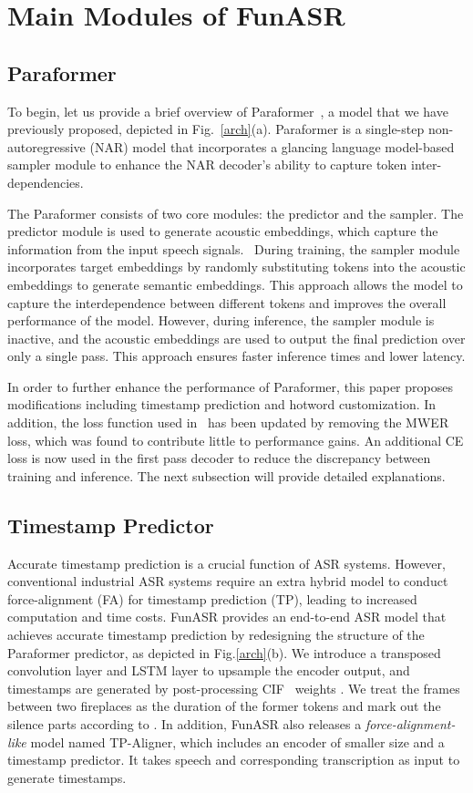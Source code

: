 \documentclass{INTERSPEECH2023}
\begin{document}
\section{Main Modules of FunASR}

\subsection{Paraformer}

To begin, let us provide a brief overview of Paraformer~\cite{gao2022paraformer}, a model that we have previously proposed, depicted in Fig.~\ref{arch}(a). Paraformer is a single-step non-autoregressive (NAR) model that incorporates a glancing language model-based sampler module to enhance the NAR decoder's ability to capture token inter-dependencies.


The Paraformer consists of two core modules: the predictor and the sampler. The predictor module is used to generate acoustic embeddings, which capture the information from the input speech signals. 
\
During training, the sampler module incorporates target embeddings by randomly substituting tokens into the acoustic embeddings to generate semantic embeddings. This approach allows the model to capture the interdependence between different tokens and improves the overall performance of the model. However, during inference, the sampler module is inactive, and the acoustic embeddings are used to output the final prediction over only a single pass. This approach ensures faster inference times and lower latency.


In order to further enhance the performance of Paraformer, this paper proposes modifications including timestamp prediction and hotword customization. In addition, the loss function used in~\cite{gao2022paraformer} has been updated by removing the MWER loss, which was found to contribute little to performance gains. An additional CE loss is now used in the first pass decoder to reduce the discrepancy between training and inference. The next subsection will provide detailed explanations.

\subsection{Timestamp Predictor}

Accurate timestamp prediction is a crucial function of ASR systems. However, conventional industrial ASR systems require an extra hybrid model to conduct force-alignment (FA) for timestamp prediction (TP), leading to increased computation and time costs. FunASR provides an end-to-end ASR model that achieves accurate timestamp prediction by redesigning the structure of the Paraformer predictor, as depicted in Fig.\ref{arch}(b). We introduce a transposed convolution layer and LSTM layer to upsample the encoder output, and timestamps are generated by post-processing CIF~\cite{dong2020cif} weights . We treat the frames between two fireplaces as the duration of the former tokens and mark out the silence parts according to . In addition, FunASR also releases a \textit{force-alignment-like} model named TP-Aligner, which includes an encoder of smaller size and a timestamp predictor. It takes speech and corresponding transcription as input to generate timestamps.
\end{document}
